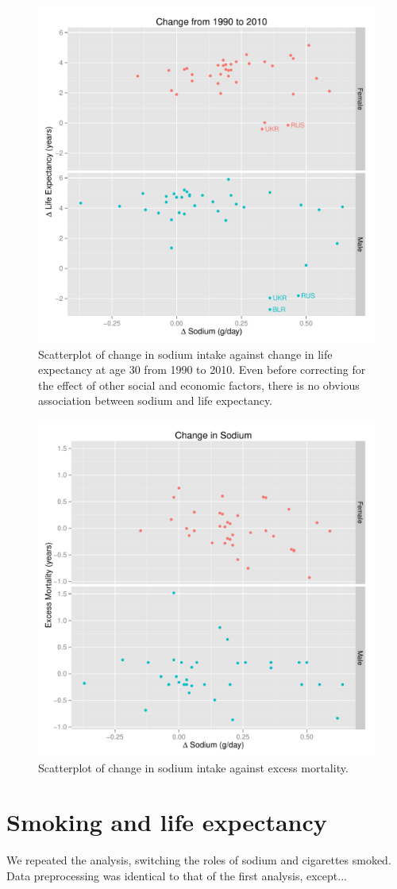 \documentclass{article}
\begin{document}
\begin{figure}
\centering
\includegraphics[scale = 0.75]{sodium_lifeexp.pdf}
\caption{Scatterplot of change in sodium intake against change in life expectancy at age 30 from 1990 to 2010. Even before correcting for the effect of other social and economic factors, there is no obvious association between sodium and life expectancy.}\label{fig:sodium_lifeexp}
\end{figure}

\begin{figure}
\centering
\includegraphics[scale = 0.75]{sodium_exmort.pdf}
\caption{Scatterplot of change in sodium intake against excess mortality.}\label{fig:sodium_excessmortality}
\end{figure}

\section{Smoking and life expectancy}
We repeated the analysis, switching the roles of sodium and cigarettes smoked.  Data preprocessing was identical to that of the first analysis, except...
\end{document}
